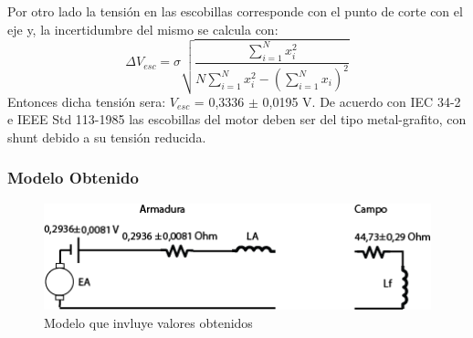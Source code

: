 \documentclass[11pt,letterpaper]{article}     %
\begin{document}
Por otro lado la tensión en las escobillas corresponde con el punto de corte con el eje y, la incertidumbre del mismo se calcula con:
\begin{equation}
	\Delta V_{esc} = \sigma \sqrt{\frac{\sum_{i=1}^{N}x_{i}^{2}}{N\sum_{i=1}^{N}x_{i}^{2}-\left(\sum_{i=1}^{N}x_{i}\right)^{2}}}
\end{equation}
Entonces dicha tensión sera: $V_{esc}$ = 0,3336 $\pm$ 0,0195 V. De acuerdo con IEC 34-2 e IEEE Std 113-1985 las escobillas del motor deben ser del tipo metal-grafito, con shunt debido a su tensión reducida. 
\subsubsection{Modelo Obtenido}
\begin{figure}[H]
	\centering
	\includegraphics[scale=0.9]{./recursos-Lab6/diagModeloObtenido.png}
	\caption{Modelo que invluye valores obtenidos}
	\label{fig:modObtenido}
\end{figure}
\end{document}

